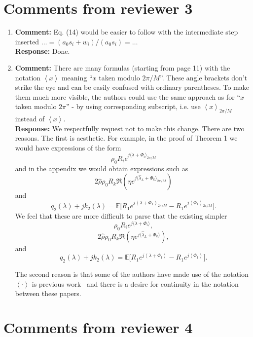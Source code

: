 \documentclass{article}
\newcommand{\fracpart}[1]{\left\langle #1 \right\rangle}
\newcommand{\sfracpart}[1]{\langle #1 \rangle}
\newcommand{\expect}{{\mathbb E}}
\begin{document}
\section{Comments from reviewer 3}

\begin{enumerate}

\item \textbf{Comment:}  Eq. (14) would be easier to follow with the intermediate step inserted $\dots = (a_0s_i + w_i)/(a_0s_i) = \dots$ \\
\textbf{Response:} Done.

\item \textbf{Comment:}  There are many formulas (starting from page 11) with the notation $\fracpart{x}$ meaning ``$x$ taken modulo $2\pi/M$''. These angle brackets don't strike the eye and can be easily confused with ordinary parentheses. To make them much more visible, the authors could use the same approach as for ``$x$ taken modulo $2\pi$'' - by using corresponding subscript, i.e. use $\fracpart{x}_{2\pi/M}$ instead of $\fracpart{x}$. \\
\textbf{Response:} We respectfully request not to make this change.  There are two reasons.  The first is aesthetic.  For example, in the proof of Theorem 1 we would have expressions of the form
\[
\rho_0 R_i e^{j\sfracpart{\lambda + \Phi_i}_{2\pi/M}}
\]
and in the appendix we would obtain expressions such as
\[
2 \hat{\rho} \rho_0 R_k \Re\left( \eta e^{j\sfracpart{\hat{\lambda}_L + \Phi_k}_{2\pi/M}}\right)
\]
and
\[
q_2(\lambda) + j k_2(\lambda) = \expect\big[ R_1 e^{j\fracpart{\lambda + \Phi_1}_{2\pi/M}} - R_1 e^{j\fracpart{\Phi_1}_{2\pi/M}}  \big].
\]
We feel that these are more difficult to parse that the existing simpler
\[
\rho_0 R_i e^{j\sfracpart{\lambda + \Phi_i}},
\]
\[
2 \hat{\rho} \rho_0 R_k \Re\left( \eta e^{j\sfracpart{\hat{\lambda}_L + \Phi_k}}\right),
\]
and
\[
q_2(\lambda) + j k_2(\lambda) = \expect\big[ R_1 e^{j\fracpart{\lambda + \Phi_1}} - R_1 e^{j\fracpart{\Phi_1}}  \big].
\]

The second reason is that some of the authors have made use of the notation $\fracpart{\cdot}$ is previous work~\cite{McKilliamFrequencyEstimationByPhaseUnwrapping2009,McKilliam_mean_dir_est_sq_arc_length2010,McKilliam_pps_unwrapping_tsp_2014} and there is a desire for continuity in the notation between these papers.

 \end{enumerate}

\section{Comments from reviewer 4}
\end{document}

